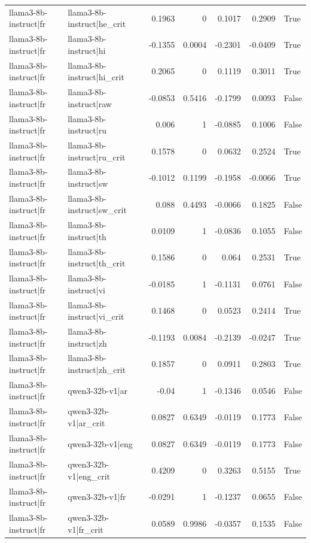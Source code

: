 \begin{table}
\begin{tabular}{l l r r r r l}
llama3-8b-instruct|fr & llama3-8b-instruct|he_crit & 0.1963 & 0 & 0.1017 & 0.2909 & True \\
llama3-8b-instruct|fr & llama3-8b-instruct|hi & -0.1355 & 0.0004 & -0.2301 & -0.0409 & True \\
llama3-8b-instruct|fr & llama3-8b-instruct|hi_crit & 0.2065 & 0 & 0.1119 & 0.3011 & True \\
llama3-8b-instruct|fr & llama3-8b-instruct|raw & -0.0853 & 0.5416 & -0.1799 & 0.0093 & False \\
llama3-8b-instruct|fr & llama3-8b-instruct|ru & 0.006 & 1 & -0.0885 & 0.1006 & False \\
llama3-8b-instruct|fr & llama3-8b-instruct|ru_crit & 0.1578 & 0 & 0.0632 & 0.2524 & True \\
llama3-8b-instruct|fr & llama3-8b-instruct|sw & -0.1012 & 0.1199 & -0.1958 & -0.0066 & True \\
llama3-8b-instruct|fr & llama3-8b-instruct|sw_crit & 0.088 & 0.4493 & -0.0066 & 0.1825 & False \\
llama3-8b-instruct|fr & llama3-8b-instruct|th & 0.0109 & 1 & -0.0836 & 0.1055 & False \\
llama3-8b-instruct|fr & llama3-8b-instruct|th_crit & 0.1586 & 0 & 0.064 & 0.2531 & True \\
llama3-8b-instruct|fr & llama3-8b-instruct|vi & -0.0185 & 1 & -0.1131 & 0.0761 & False \\
llama3-8b-instruct|fr & llama3-8b-instruct|vi_crit & 0.1468 & 0 & 0.0523 & 0.2414 & True \\
llama3-8b-instruct|fr & llama3-8b-instruct|zh & -0.1193 & 0.0084 & -0.2139 & -0.0247 & True \\
llama3-8b-instruct|fr & llama3-8b-instruct|zh_crit & 0.1857 & 0 & 0.0911 & 0.2803 & True \\
llama3-8b-instruct|fr & qwen3-32b-v1|ar & -0.04 & 1 & -0.1346 & 0.0546 & False \\
llama3-8b-instruct|fr & qwen3-32b-v1|ar_crit & 0.0827 & 0.6349 & -0.0119 & 0.1773 & False \\
llama3-8b-instruct|fr & qwen3-32b-v1|eng & 0.0827 & 0.6349 & -0.0119 & 0.1773 & False \\
llama3-8b-instruct|fr & qwen3-32b-v1|eng_crit & 0.4209 & 0 & 0.3263 & 0.5155 & True \\
llama3-8b-instruct|fr & qwen3-32b-v1|fr & -0.0291 & 1 & -0.1237 & 0.0655 & False \\
llama3-8b-instruct|fr & qwen3-32b-v1|fr_crit & 0.0589 & 0.9986 & -0.0357 & 0.1535 & False \\

\end{tabular}
\end{table}
